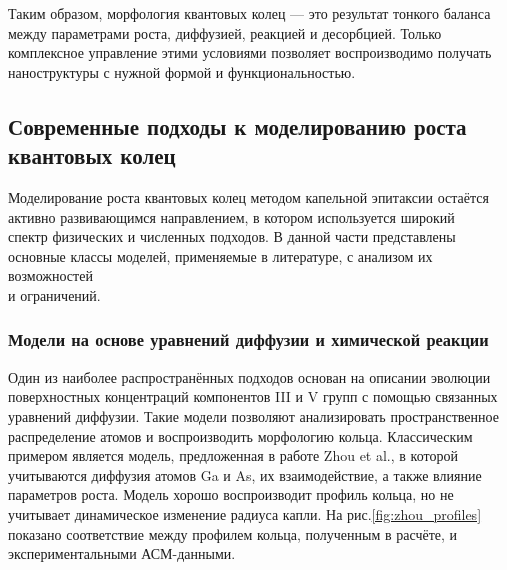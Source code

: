 \documentclass[14pt,oneside]{extarticle}
\begin{document}
Таким образом, морфология квантовых колец — это результат тонкого баланса между параметрами роста, диффузией, реакцией и десорбцией. Только комплексное управление этими условиями позволяет воспроизводимо получать наноструктуры с нужной формой и функциональностью.

\subsection{Современные подходы к моделированию роста квантовых колец}

Моделирование роста квантовых колец методом капельной эпитаксии остаётся активно развивающимся направлением, в котором используется широкий\\ 
спектр физических и численных подходов. В данной части представлены основные классы моделей, применяемые в литературе, с анализом их возможностей\\ 
и ограничений.

\subsubsection*{Модели на основе уравнений диффузии и химической реакции}

Один из наиболее распространённых подходов основан на описании эволюции поверхностных концентраций компонентов III и V групп с помощью связанных уравнений диффузии. Такие модели позволяют анализировать пространственное распределение атомов и воспроизводить морфологию кольца. Классическим примером является модель, предложенная в работе Zhou et al.\cite{zhou2013}, в которой учитываются диффузия атомов Ga и As, их взаимодействие, а также влияние параметров роста. Модель хорошо воспроизводит профиль кольца, но не учитывает динамическое изменение радиуса капли. На рис.\ref{fig:zhou_profiles} показано соответствие между профилем кольца, полученным в расчёте, и экспериментальными АСМ-данными.
\end{document}
